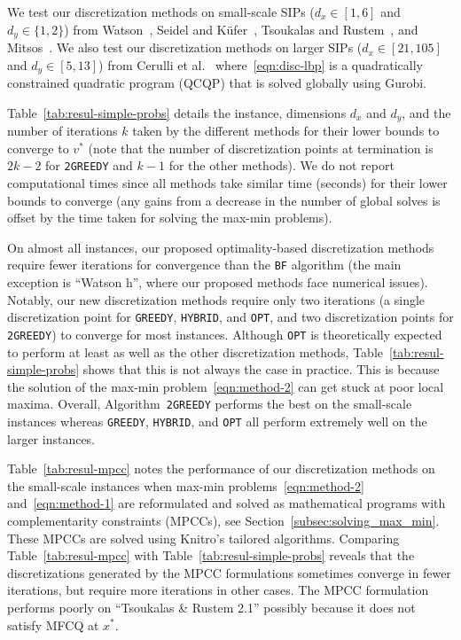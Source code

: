\documentclass{article}
\newcommand{\1}[1]{\mathds{1}\left[#1\right]}
\begin{document}
We test our discretization methods on small-scale SIPs ($d_x \in [1,6]$ and $d_y \in \{1,2\}$) from Watson~\cite{watson1983numerical}, Seidel and K{\"u}fer~\cite{seidel2020adaptive}, Tsoukalas and Rustem~\cite{tsoukalas2011feasible}, and Mitsos~\cite{mitsos2009test}.
We also test our discretization methods on larger SIPs ($d_x \in [21, 105]$ and $d_y \in [5, 13]$) from Cerulli et al.\ \cite{cerulli2022convergent} where~\eqref{eqn:disc-lbp} is a quadratically constrained quadratic program (QCQP) that is solved globally using Gurobi.


Table~\ref{tab:resul-simple-probs} details the instance, dimensions $d_x$ and $d_y$, and the number of iterations $k$ taken by the different methods for their lower bounds to converge to $v^*$ (note that the number of discretization points at termination is $2k-2$ for \texttt{2GREEDY} and $k-1$ for the other methods).
We do not report computational times since all methods take similar time (seconds) for their lower bounds to converge (any gains from a decrease in the number of global solves is offset by the time taken for solving the max-min problems).


On almost all instances, our proposed optimality-based discretization methods require fewer iterations for convergence than the \texttt{BF} algorithm (the main exception is ``Watson h'', where our proposed methods face numerical issues).
Notably, our new discretization methods require only two iterations (a single discretization point for \texttt{GREEDY}, \texttt{HYBRID}, and \texttt{OPT}, and two discretization points for \texttt{2GREEDY}) to converge for most instances.
Although \texttt{OPT} is theoretically expected to perform at least as well as the other discretization methods, Table~\ref{tab:resul-simple-probs} shows that this is not always the case in practice.
This is because the solution of the max-min problem~\eqref{eqn:method-2} can get stuck at poor local maxima.
Overall, Algorithm~\texttt{2GREEDY} performs the best on the small-scale instances whereas \texttt{GREEDY}, \texttt{HYBRID}, and \texttt{OPT} all perform extremely well on the larger instances.




Table~\ref{tab:resul-mpcc} notes the performance of our discretization methods on the small-scale instances when max-min problems~\eqref{eqn:method-2} and~\eqref{eqn:method-1} are reformulated and solved as mathematical programs with complementarity constraints (MPCCs), see Section~\ref{subsec:solving_max_min}.
These MPCCs are solved using Knitro's tailored algorithms.
Comparing Table~\ref{tab:resul-mpcc} with Table~\ref{tab:resul-simple-probs} reveals that the discretizations generated by the MPCC formulations sometimes converge in fewer iterations, but require more iterations in other cases.
The MPCC formulation performs poorly on ``Tsoukalas \& Rustem 2.1'' possibly because it does not satisfy MFCQ at $x^*$.
\end{document}
